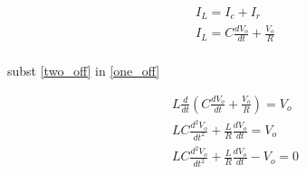 \documentclass{article}
\begin{document}
\begin{equation} \label{two_off}
\begin{split}
I_L = I_c + I_r \\
I_L = C \frac{dV_o}{dt} + \frac{V_o}{R} \\
\end{split}
\end{equation}

\filbreak
subst \ref{two_off} in \ref{one_off}

\begin{equation}
\begin{split}
L\frac{d}{dt} (	C \frac{dV_o}{dt} + \frac{V_o}{R} ) = V_o \\
L C \frac{d^2 V_o}{dt^2} + \frac{L}{R} \frac{d V_o}{dt} = V_o \\
L C \frac{d^2 V_o}{dt^2} + \frac{L}{R} \frac{d V_o}{dt} - V_o = 0 \\
\end{split}
\end{equation}
\end{document}
